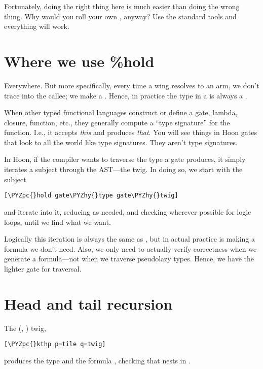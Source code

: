 Fortunately, doing the right thing here is much easier than doing
the wrong thing.  Why would you roll your own , anyway?
Use the standard tools and everything will work.

\section{Where we use \%hold}

Everywhere.  But more specifically, every time a wing resolves to
an arm, we don't trace into the callee; we make a .
Hence, in practice the type in a  is always a .

When other typed functional languages construct or define a gate,
lambda, closure, function, etc., they generally compute a ``type
signature'' for the function.  I.e., it accepts \emph{this} and produces
\emph{that}.  You will see things in Hoon gates that look to all the
world like type signatures.  They aren't type signatures.

In Hoon, if the compiler wants to traverse the type a gate
produces, it simply iterates a subject through the AST---the
twig.  In doing so, we start with the subject

\begin{framed_shaded}
\begin{Verbatim}[fontsize=\relsize{-2.5},fontseries=b,commandchars=\\\{\}]
[\PYZpc{}hold gate\PYZhy{}type gate\PYZhy{}twig]
\end{Verbatim}
\end{framed_shaded}
and iterate into it, reducing as needed, and checking wherever
possible for logic loops, until we find what we want.

Logically this iteration is always the same as ,
but in actual practice  is making a formula we don't
need.  Also, we only need to actually verify correctness when we
generate a formula---not when we traverse pseudolazy types.
Hence, we have the lighter  gate for traversal.

\section{Head and tail recursion}

The \kode{\ket -} (, ) twig, 

\begin{framed_shaded}
\begin{Verbatim}[fontsize=\relsize{-2.5},fontseries=b,commandchars=\\\{\}]
[\PYZpc{}kthp p=tile q=twig]
\end{Verbatim}
\end{framed_shaded}
produces the type  and the formula
, checking that  nests in
.  

